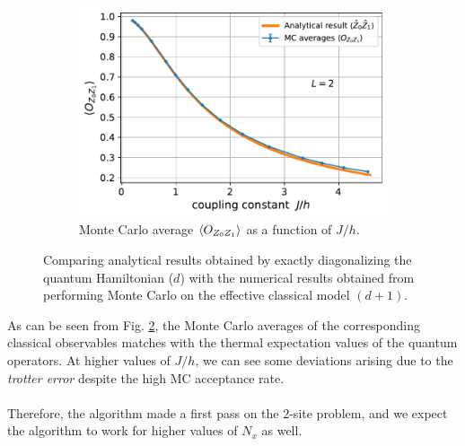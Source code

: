 \documentclass[../thesis_main.tex]{subfiles}
\begin{document}
\begin{figure}[!htb]\ContinuedFloat
    \centering
    \begin{subfigure}[b]{0.6\textwidth}  %
        \centering
        \includegraphics[width=\textwidth]{images/2_site/O_Z0Z1.pdf}
        \caption{Monte Carlo average $\expval{O_{Z_0 Z_1}}$ as a function of $J/h$.}
        \label{expval_O_ZZ_vs_J/h_2}
    \end{subfigure}
    \caption{Comparing analytical results obtained by exactly diagonalizing the quantum Hamiltonian ($d$)  with the numerical results obtained from performing Monte Carlo on the effective classical model $(d+1)$.}
    \label{expval_O_vs_J/h_2}
\end{figure}
\FloatBarrier
As can be seen from Fig. \ref{expval_O_vs_J/h_2}, the Monte Carlo averages of the corresponding classical observables matches with the thermal expectation values of the quantum operators. At higher values of $J/h$, we can see some deviations arising due to the \textit{trotter error} despite the high MC acceptance rate.~\\~\\
Therefore, the algorithm made a first pass on the $2$-site problem, and we expect the algorithm to work for higher values of $N_x$ as well.   
\end{document}
